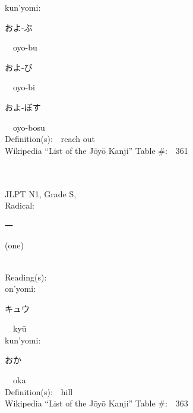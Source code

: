 \begin{multicols}{2}
{\hspace*{1em}}kun'yomi:\ \ \\
{\hspace*{2em}}{\begin{CJK}{UTF8}{min} およ-ぶ \end{CJK}}\ \ oyo-bu\ \ \\
{\hspace*{2em}}{\begin{CJK}{UTF8}{min} およ-び \end{CJK}}\ \ oyo-bi\ \ \\
{\hspace*{2em}}{\begin{CJK}{UTF8}{min} およ-ぼす \end{CJK}}\ \ oyo-bosu\ \ \\
Definition(s):\ \ reach out \\
Wikipedia ``List of the J\=oy\=o Kanji'' Table \#:\ \ 361 \\
\ \ \\
{\fontsize{34pt}{40pt}  }\ \ \\
{JLPT N1, Grade S, \\Radical:\ \ {\begin{CJK}{UTF8}{min} 一 \end{CJK}} (one) } \\
Reading(s):\ \ \\
{\hspace*{1em}}on'yomi:\ \ \\
{\hspace*{2em}}{\begin{CJK}{UTF8}{min} キュウ \end{CJK}}\ \ ky\=u\ \ \\
{\hspace*{1em}}kun'yomi:\ \ \\
{\hspace*{2em}}{\begin{CJK}{UTF8}{min} おか \end{CJK}}\ \ oka\ \ \\
Definition(s):\ \ hill \\
Wikipedia ``List of the J\=oy\=o Kanji'' Table \#:\ \ 363 \\
\ \ \\
{\fontsize{34pt}{40pt}  }\ \ \\

\end{multicols}
